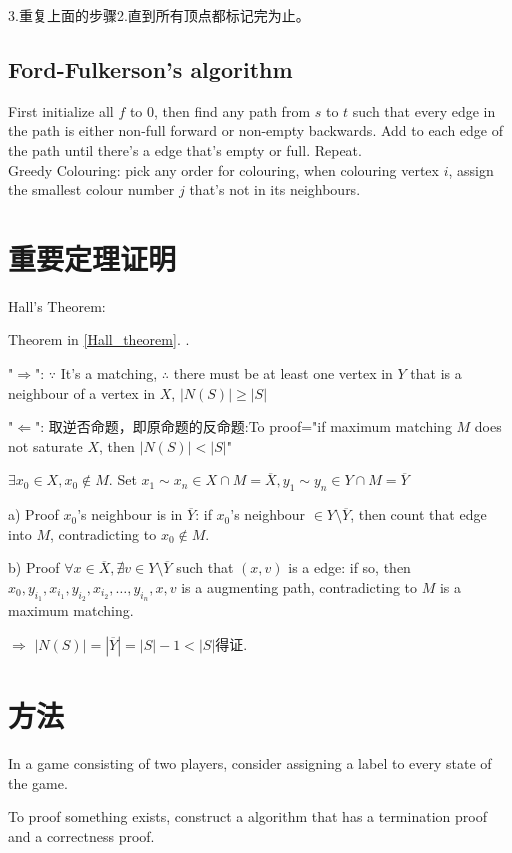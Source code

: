 \documentclass[12pt,a4paper]{ctexrep}
\begin{document}
3.重复上面的步骤2.直到所有顶点都标记完为止。

\subsection{Ford-Fulkerson's algorithm}
First initialize all $f$ to 0, then find any path from $s$ to $t$ such that every edge in the path is either non-full forward or non-empty backwards. Add to each edge of the path until there's a edge that's empty or full. Repeat.\\

\noindent Greedy Colouring: pick any order for colouring, when colouring vertex $i$, assign the smallest colour number $j$ that's not in its neighbours.
\section{重要定理证明}
\noindent Hall's Theorem:

Theorem in \hyperlink{Hall_theorem}{\ref{Hall_theorem}}. \label{Hall_proof}\hypertarget{Hall_proof}{}.

"$\Rightarrow$": $\because$ It's a matching, $\therefore$ there must be at least one vertex in $Y$ that is a neighbour of a vertex in $X$, $|N(S)|\geq |S|$

"$\Leftarrow$": 取逆否命题，即原命题的反命题:To proof="if maximum matching $M$ does not saturate $X$, then $|N(S)|<|S|$"

$\exists x_{0}\in X, x_{0}\notin M.$ Set $x_{1} \sim x_{n} \in X\cap M = \overline{X}, y_{1} \sim y_{n} \in Y\cap M = \overline{Y}$

a) Proof $x_{0}$'s neighbour is in $\overline{Y}$: if $x_{0}$'s neighbour $\in Y\setminus\overline{Y}$, then count that edge into $M$, contradicting to $x_{0} \notin M$.

b) Proof $\forall x \in \overline{X}, \nexists v\in Y\setminus\overline{Y}$ such that $(x,v)$ is a edge: if so, then $x_{0}, y_{i_{1}}, x_{i_{1}}, y_{i_{2}}, x_{i_{2}}, \dots, y_{i_{n}}, x, v$ is a augmenting path, contradicting to $M$ is a maximum matching.

$\Rightarrow$ $|N(S)| = |\overline{Y}| = |S|-1 < |S|$得证.
\section{方法}
In a game consisting of two players, consider assigning a label to every state of the game.

To proof something exists, construct a algorithm that has a termination proof and a correctness proof.

\ifdebug
\end{document}
